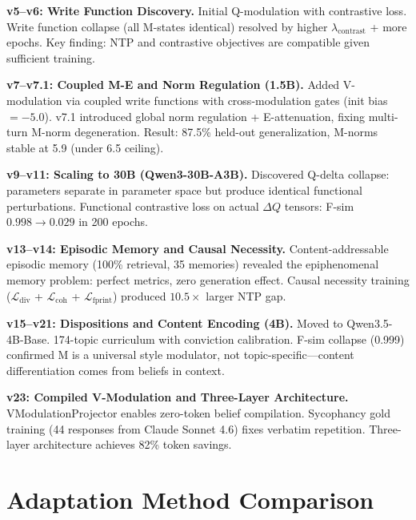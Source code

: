 
\textbf{v5--v6: Write Function Discovery.} Initial Q-modulation with contrastive loss. Write function collapse (all M-states identical) resolved by higher $\lambda_\text{contrast}$ + more epochs. Key finding: NTP and contrastive objectives are compatible given sufficient training.

\textbf{v7--v7.1: Coupled M-E and Norm Regulation (1.5B).} Added V-modulation via coupled write functions with cross-modulation gates (init bias $= -5.0$). v7.1 introduced global norm regulation + E-attenuation, fixing multi-turn M-norm degeneration. Result: 87.5\% held-out generalization, M-norms stable at 5.9 (under 6.5 ceiling).

\textbf{v9--v11: Scaling to 30B (Qwen3-30B-A3B).} Discovered Q-delta collapse: parameters separate in parameter space but produce identical functional perturbations. Functional contrastive loss on actual $\Delta Q$ tensors: F-sim $0.998 \to 0.029$ in 200 epochs.

\textbf{v13--v14: Episodic Memory and Causal Necessity.} Content-addressable episodic memory (100\% retrieval, 35 memories) revealed the epiphenomenal memory problem: perfect metrics, zero generation effect. Causal necessity training ($\mathcal{L}_\text{div}$ + $\mathcal{L}_\text{coh}$ + $\mathcal{L}_\text{fprint}$) produced $10.5\times$ larger NTP gap.

\textbf{v15--v21: Dispositions and Content Encoding (4B).} Moved to Qwen3.5-4B-Base. 174-topic curriculum with conviction calibration. F-sim collapse (0.999) confirmed M is a universal style modulator, not topic-specific---content differentiation comes from beliefs in context.

\textbf{v23: Compiled V-Modulation and Three-Layer Architecture.} VModulationProjector enables zero-token belief compilation. Sycophancy gold training (44 responses from Claude Sonnet 4.6) fixes verbatim repetition. Three-layer architecture achieves 82\% token savings.


\section{Adaptation Method Comparison}
\label{sec:adaptation_comparison}

